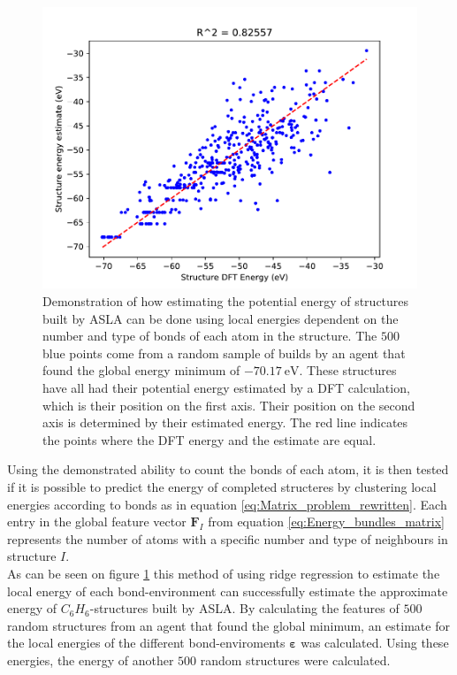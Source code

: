 \begin{figure}
	\centering
	\centerline{
		\includegraphics[width=\columnwidth]{graphics/energy_prediction.pdf}
		}
	\captionsetup{width=1.2\columnwidth}
	\caption{Demonstration of how estimating the potential energy of structures built by ASLA can be done using local energies dependent on the number and type of bonds of each atom in the structure. The $500$ blue points come from a random sample of builds by an agent that found the global energy minimum of $\SI{-70.17}{\electronvolt}$. These structures have all had their potential energy estimated by a DFT calculation, which is their position on the first axis. Their position on the second axis is determined by their estimated energy. The red line indicates the points where the DFT energy and the estimate are equal.}
	\label{fig:energy_prediction}
\end{figure}

Using the demonstrated ability to count the bonds of each atom, it is then tested if it is possible to predict the energy of completed structeres by clustering local energies according to bonds as in equation \eqref{eq:Matrix_problem_rewritten}. Each entry in the global feature vector $\mathbf{F}_I$ from equation \eqref{eq:Energy_bundles_matrix} represents the number of atoms with a specific number and type of neighbours in structure $I$.\\ 

As can be seen on figure \ref{fig:energy_prediction} this method of using ridge regression to estimate the local energy of each bond-environment can successfully estimate the approximate energy of $C_6H_6$-structures built by ASLA. By calculating the features of $500$ random structures from an agent that found the global minimum, an estimate for the local energies of the different bond-enviroments $\bm{\varepsilon}$ was calculated. Using these energies, the energy of another $500$ random structures were calculated. \\

